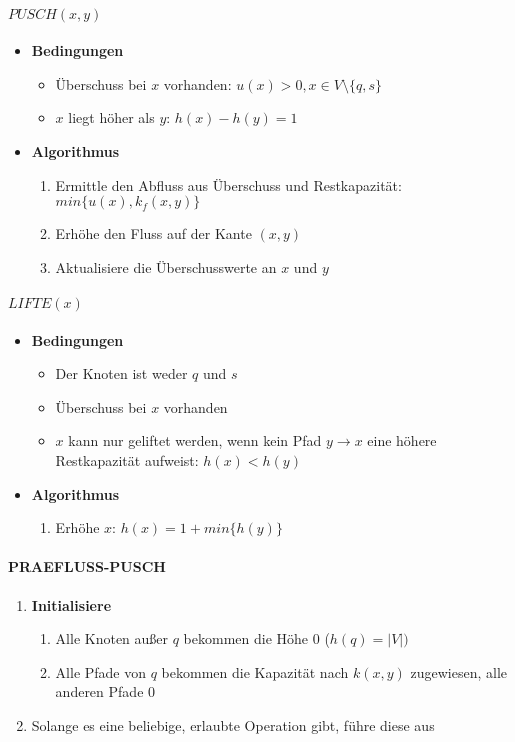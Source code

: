 \paragraph{\(PUSCH(x,y)\)}
\begin{itemize}
	\item \textbf{Bedingungen}
	\begin{itemize}
		\item Überschuss bei \(x\) vorhanden: \(u(x) > 0, x \in V \setminus \{q,s\}\)
		\item \(x\) liegt höher als \(y\): \(h(x) - h(y) = 1\)
	\end{itemize}
	\item \textbf{Algorithmus}
	\begin{enumerate}
		\item Ermittle den Abfluss aus Überschuss und Restkapazität: \(min\{u(x), k_f(x,y)\}\)
		\item Erhöhe den Fluss auf der Kante \((x,y)\)
		\item Aktualisiere die Überschusswerte an \(x\) und \(y\)
	\end{enumerate}
\end{itemize}

\paragraph{\(LIFTE(x)\)}
\begin{itemize}
	\item \textbf{Bedingungen}
	\begin{itemize}
		\item Der Knoten ist weder \(q\) und \(s\)
		\item Überschuss bei \(x\) vorhanden
		\item \(x\) kann nur geliftet werden, wenn kein Pfad \(y \rightarrow x\) eine höhere Restkapazität aufweist: \(h(x) < h(y)\)
	\end{itemize}
	\item \textbf{Algorithmus}
	\begin{enumerate}
		\item Erhöhe \(x\): \(h(x) = 1 + min\{h(y)\}\)
	\end{enumerate}
\end{itemize}

\paragraph{PRAEFLUSS-PUSCH}
\begin{enumerate}
	\item \textbf{Initialisiere}
	\begin{enumerate}
		\item Alle Knoten außer \(q\) bekommen die Höhe \(0\) (\(h(q) = |V|)\)
		\item Alle Pfade von \(q\) bekommen die Kapazität nach \(k(x,y)\) zugewiesen, alle anderen Pfade \(0\)
	\end{enumerate}
	\item Solange es eine beliebige, erlaubte Operation gibt, führe diese aus
\end{enumerate}

